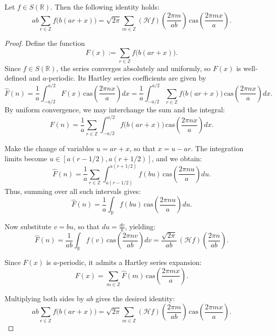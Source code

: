 \documentclass[10pt,a4paper]{amsart}
\begin{document}
\begin{theorem}\label{T1}
Let \( f \in S(\mathbb{R}) \). Then the following identity holds:
\begin{equation}\label{1f1}
ab \sum_{r \in \mathbb{Z}} f\big(b(ar + x)\big)
= \sqrt{2\pi} \sum_{m \in \mathbb{Z}} (\mathscr{H}f)\left( \frac{2\pi m}{ab} \right) \, \mathrm{cas}\left( \frac{2\pi m x}{a} \right).
\end{equation}
\end{theorem}

\begin{proof}
Define the function
\[
F(x) := \sum_{r \in \mathbb{Z}} f\big(b(ar + x)\big).
\]
Since \( f \in S(\mathbb{R}) \), the series converges absolutely and uniformly, so \( F(x) \) is well-defined and \( a \)-periodic. Its Hartley series coefficients are given by
\[
\widehat{F}(n) = \frac{1}{a} \int_{-a/2}^{a/2} F(x) \, \mathrm{cas}\left( \frac{2\pi n x}{a} \right) dx
= \frac{1}{a} \int_{-a/2}^{a/2} \sum_{r \in \mathbb{Z}} f\big(b(ar + x)\big) \, \mathrm{cas}\left( \frac{2\pi n x}{a} \right) dx.
\]
By uniform convergence, we may interchange the sum and the integral:
\[
\widehat{F}(n) = \frac{1}{a} \sum_{r \in \mathbb{Z}} \int_{-a/2}^{a/2} f\big(b(ar + x)\big) \, \mathrm{cas}\left( \frac{2\pi n x}{a} \right) dx.
\]

Make the change of variables \( u = ar + x \), so that \( x = u - ar \). The integration limits become \( u \in [a(r - 1/2), a(r + 1/2)] \), and we obtain:
\[
\widehat{F}(n) = \frac{1}{a} \sum_{r \in \mathbb{Z}} \int_{a(r - 1/2)}^{a(r + 1/2)} f(bu) \, \mathrm{cas}\left( \frac{2\pi n u}{a} \right) du.
\]
Thus, summing over all such intervals gives:
\[
\widehat{F}(n) = \frac{1}{a} \int_{\mathbb{R}} f(bu) \, \mathrm{cas}\left( \frac{2\pi n u}{a} \right) du.
\]

Now substitute \( v = bu \), so that \( du = \frac{dv}{b} \), yielding:
\[
\widehat{F}(n) = \frac{1}{ab} \int_{\mathbb{R}} f(v) \, \mathrm{cas}\left( \frac{2\pi n v}{ab} \right) dv
= \frac{\sqrt{2\pi}}{ab} \, (\mathscr{H}f)\left( \frac{2\pi n}{ab} \right).
\]

Since \( F(x) \) is \( a \)-periodic, it admits a Hartley series expansion:
\[
F(x) = \sum_{m \in \mathbb{Z}} \widehat{F}(m) \, \mathrm{cas}\left( \frac{2\pi m x}{a} \right).
\]

Multiplying both sides by \( ab \) gives the desired identity:
\[
ab \sum_{r \in \mathbb{Z}} f\big(b(ar + x)\big)
= \sqrt{2\pi} \sum_{m \in \mathbb{Z}} (\mathscr{H}f)\left( \frac{2\pi m}{ab} \right) \, \mathrm{cas}\left( \frac{2\pi m x}{a} \right).
\]
\end{proof}
\end{document}
